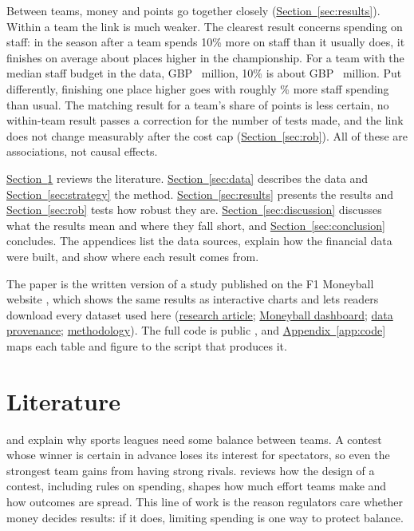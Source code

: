 \documentclass[11pt,a4paper]{article}
\newcommand{\site}{https://nahianibnat-2000.github.io/F1-moneyball}
\newcommand{\sitepage}[2]{\href{\site/#1}{#2}}
\begin{document}
Between teams, money and points go together closely (\hyperref[sec:results]{Section~\ref*{sec:results}}).
Within a team the link is much weaker. The clearest result concerns spending on staff: in the season after a team spends
10\% more on staff than it usually does, it finishes on average about \PosTenStaffcosts{} places higher in the championship.
For a team with the median staff budget in the data, GBP~\MedStaffM{} million, 10\% is about GBP~\TenPctStaffM{} million.
Put differently, finishing one place higher goes with roughly \OnePlaceStaff\% more staff spending than usual. The matching
result for a team's share of points is less certain, no within-team result passes a correction for the number of tests
made, and the link does not change measurably after the cost cap (\hyperref[sec:rob]{Section~\ref*{sec:rob}}). All of these
are associations, not causal effects.

\hyperref[sec:lit]{Section~\ref*{sec:lit}} reviews the literature.
\hyperref[sec:data]{Section~\ref*{sec:data}} describes the data and \hyperref[sec:strategy]{Section~\ref*{sec:strategy}}
the method. \hyperref[sec:results]{Section~\ref*{sec:results}} presents the results and \hyperref[sec:rob]{Section~\ref*{sec:rob}}
tests how robust they are. \hyperref[sec:discussion]{Section~\ref*{sec:discussion}} discusses what the results mean and
where they fall short, and \hyperref[sec:conclusion]{Section~\ref*{sec:conclusion}} concludes. The appendices list the data
sources, explain how the financial data were built, and show where each result comes from.

The paper is the written version of a study published on the F1 Moneyball website \citep{f1moneyball}, which shows the
same results as interactive charts and lets readers download every dataset used here
(\sitepage{research/does-money-buy-speed}{research article}; \sitepage{moneyball}{Moneyball dashboard};
\sitepage{provenance}{data provenance}; \sitepage{methodology}{methodology}). The full code is public
\citep{f1moneyballcode}, and \hyperref[app:code]{Appendix~\ref*{app:code}} maps each table and figure to the script that
produces it.

\section{Literature}
\label{sec:lit}

\citet{rottenberg1956} and \citet{neale1964} explain why sports leagues need
some balance between teams. A contest whose winner is certain in advance loses its interest for spectators, so even the
strongest team gains from having strong rivals. \citet{szymanski2003} reviews how the design of a contest, including rules
on spending, shapes how much effort teams make and how outcomes are spread. This line of work is the reason regulators care
whether money decides results: if it does, limiting spending is one way to protect balance.
\end{document}
